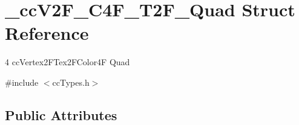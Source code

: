 \hypertarget{struct__cc_v2_f___c4_f___t2_f___quad}{\section{\-\_\-cc\-V2\-F\-\_\-\-C4\-F\-\_\-\-T2\-F\-\_\-\-Quad Struct Reference}
\label{struct__cc_v2_f___c4_f___t2_f___quad}
}


4 cc\-Vertex2\-F\-Tex2\-F\-Color4\-F Quad  




{\ttfamily \#include $<$cc\-Types.\-h$>$}

\subsection*{Public Attributes}
